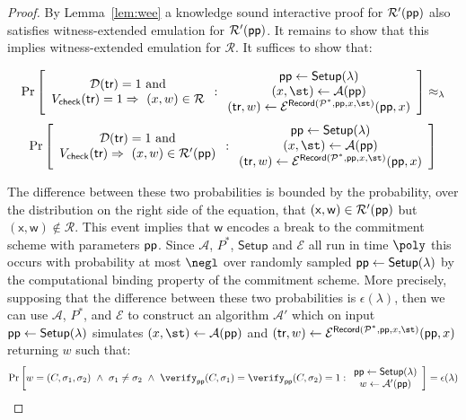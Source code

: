 \begin{proof}
By Lemma~\ref{lem:wee} a knowledge sound interactive proof for $\mathcal{R}'(\textsf{pp})$ also satisfies witness-extended emulation for $\mathcal{R}'(\textsf{pp})$. It remains to show that this implies witness-extended emulation for $\mathcal{R}$. It suffices to show that: 

\begin{small}
\[
\Pr \left[
\begin{array}{c} 
\mathcal{D}(\textsf{tr}) = 1 \ \text{and} \\ 
V_{\textsf{check}}(\tr) = 1 \Rightarrow \ (x, w) \in \mathcal{R}
\end{array} 
:
\begin{array}{c}
             \params \leftarrow \textsf{Setup}(\lambda) \\
             (x, \st) \leftarrow \mathcal{A}(\params) \\
(\textsf{tr}, w) \leftarrow \mathcal{E}^{\textsf{Record}(\prover^*, \params, x, \st)}(\params, x)
\end{array}
\right] \approx_\lambda
\]
\[
\Pr \left[
\begin{array}{c} 
\mathcal{D}(\textsf{tr}) = 1 \ \text{and} \\ 
V_{\textsf{check}}(\tr) \Rightarrow \ (x, w) \in \mathcal{R}'(\crs)
\end{array} 
:
\begin{array}{c}
             \params \leftarrow \textsf{Setup}(\lambda) \\
             (x, \st) \leftarrow \mathcal{A}(\params) \\
(\textsf{tr}, w) \leftarrow \mathcal{E}^{\textsf{Record}(\prover^*, \params, x, \st)}(\params, x)
\end{array}
\right]
\]
\end{small}

The difference between these two probabilities is bounded by the probability, over the distribution on the right side of the equation, that $(\mathsf{x}, \mathsf{w}) \in \mathcal{R}'(\textsf{pp})$ but $(\mathsf{x}, \mathsf{w}) \not \in \mathcal{R}$. This event implies that $\mathsf{w}$ encodes a break to the commitment scheme with parameters $\textsf{pp}$. Since $\mathcal{A}$, $P^*$, $\textsf{Setup}$ and $\mathcal{E}$ all run in time $\poly$ this occurs with probability at most $\negl$ over randomly sampled $\textsf{pp} \gets \textsf{{Setup}}(\lambda)$ by the computational binding property of the commitment scheme. More precisely, supposing that the difference between these two probabilities is $\epsilon(\lambda)$, then we can use $\mathcal{A}$, $P^*$, and $\mathcal{E}$ to construct an algorithm $\mathcal{A}'$ which on input $\textsf{pp} \gets \textsf{{Setup}}(\lambda)$ simulates $(x, \st) \gets \mathcal{A}(\crs)$ and $(\tr, w) \gets \mathcal{E}^{\textsf{Record}(\prover^*, \params, x, \st)}(\params, x)$ returning $w$ such that: 
\[
\Pr \left[
w = (C, \sigma_1, \sigma_2) \ \wedge \ \sigma_1 \neq \sigma_2 \ \wedge \ \verify_\crs(C, \sigma_1) = \verify_\crs(C, \sigma_2) = 1
:
\begin{array}{c}
             \params \leftarrow \textsf{Setup}(\lambda) \\
             w \gets \mathcal{A}'(\crs)
\end{array}
\right] = \epsilon(\lambda) 
\]


\end{proof}

